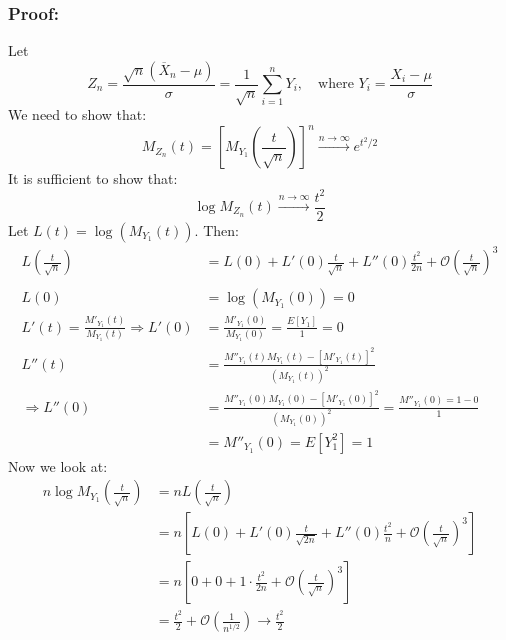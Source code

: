 \documentclass{article}
\begin{document}
\subsubsection*{Proof:}
Let
\begin{equation*}
    Z_n = \frac{\sqrt{n}\left(\overline{X}_n - \mu \right)}{\sigma} = \frac{1}{\sqrt{n}} \sum_{i=1}^n Y_i, \quad \text{where } Y_i = \frac{X_i-\mu}{\sigma}
\end{equation*}
We need to show that:
\begin{equation*}
    M_{Z_n}(t) = \left[ M_{Y_1}\left(\frac{t}{\sqrt{n}} \right) \right]^n \xrightarrow{n\to\infty} e^{t^2/2}
\end{equation*}
It is sufficient to show that:
\begin{equation*}
    \log M_{Z_n}(t) \xrightarrow{n\to\infty} \frac{t^2}{2}
\end{equation*}
Let $L(t) = \log\left(M_{Y_1}(t) \right)$. Then:
\begin{equation*}
    \begin{split}
        L\left( \frac{t}{\sqrt{n}}\right) &= L(0) + L'(0)\frac{t}{\sqrt{n}} + L''(0) \frac{t^2}{2n} + \mathcal{O}\left(\frac{t}{\sqrt{n}} \right)^3\\
        \\
        L(0) &= \log\left( M_{Y_1}(0) \right) = 0\\
        L'(t) = \frac{M'_{Y_1}(t)}{M_{Y_1}(t)}\Rightarrow L'(0) &= \frac{M'_{Y_1}(0)}{M_{Y_1}(0)} = \frac{E[Y_1]}{1} = 0\\
        L''(t) &= \frac{M''_{Y_1}(t) M_{Y_1}(t) - \left[M'_{Y_1}(t) \right]^2}{\left(M_{Y_1}(t)\right)^2}\\
        \Rightarrow L''(0) &= \frac{M''_{Y_1}(0) M_{Y_1}(0) - \left[M'_{Y_1}(0) \right]^2}{\left(M_{Y_1}(0)\right)^2} = \frac{M''_{Y_1}(0)= 1 - 0}{1} \\
        &=  M''_{Y_1}(0) = E\left[Y_1^2\right] = 1
    \end{split}
\end{equation*}
Now we look at:
\begin{equation*}
    \begin{split}
        n\log M_{Y_1}\left(\frac{t}{\sqrt{n}} \right) &= nL\left(\frac{t}{\sqrt{n}} \right)\\
        &= n\left[ L(0) + L'(0)\frac{t}{\sqrt{2n}} + L''(0) \frac{t^2}{n} + \mathcal{O}\left(\frac{t}{\sqrt{n}} \right)^3 \right]\\
        &= n\left[0 + 0 + 1\cdot \frac{t^2}{2n} + \mathcal{O}\left(\frac{t}{\sqrt{n}} \right)^3\right]\\
        &= \frac{t^2}{2} +  \mathcal{O}\left(\frac{1}{n^{1/2}} \right) \rightarrow \frac{t^2}{2}
    \end{split}
\end{equation*}
\end{document}

